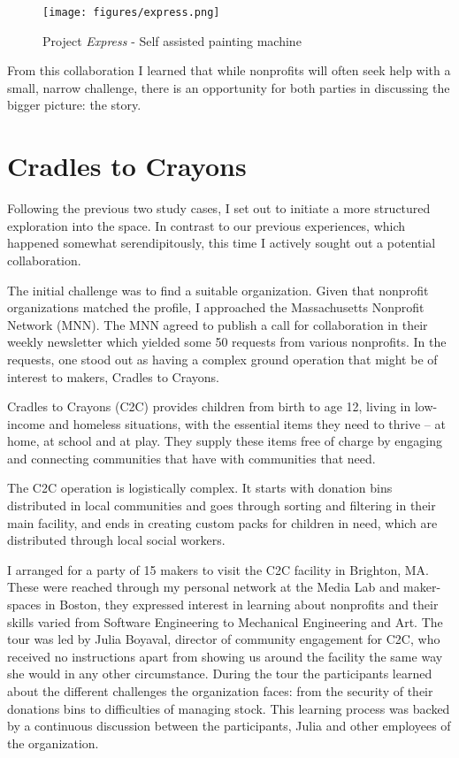    \begin{figure}[thpb]
      \centering
      \texttt{[image: figures/express.png]}
      \caption{Project \textit{Express} - Self assisted painting machine}
      \label{express}
   \end{figure}

From this collaboration I learned that while nonprofits will often seek help with a small, narrow challenge, there is an opportunity for both parties in discussing the bigger picture: the story. 

\section{Cradles to Crayons}

Following the previous two study cases, I set out to initiate a more structured exploration into the space. In contrast to our previous experiences, which happened somewhat serendipitously, this time I actively sought out a potential collaboration. 

The initial challenge was to find a suitable organization. Given that nonprofit organizations matched the profile, I approached the Massachusetts Nonprofit Network (MNN). The MNN agreed to publish a call for collaboration in their weekly newsletter which yielded some 50 requests from various nonprofits. In the requests, one stood out as having a complex ground operation that might be of interest to makers, Cradles to Crayons.   

Cradles to Crayons (C2C) provides children from birth to age 12, living in low-income and homeless situations, with the essential items they need to thrive – at home, at school and at play. They supply these items free of charge by engaging and connecting communities that have with communities that need.

The C2C operation is logistically complex. It starts with donation bins distributed in local communities and goes through sorting and filtering in their main facility, and ends in creating custom packs for children in need, which are distributed through local social workers. 

I arranged for a party of 15 makers to visit the C2C facility in Brighton, MA. These were reached through my personal network at the Media Lab and maker-spaces in Boston, they expressed interest in learning about nonprofits and their skills varied from Software Engineering to Mechanical Engineering and Art. The tour was led by Julia Boyaval, director of community engagement for C2C, who received no instructions apart from showing us around the facility the same way she would in any other circumstance. During the tour the participants learned about the different challenges the organization faces: from the security of their donations bins to difficulties of managing stock. This learning process was backed by a continuous discussion between the participants, Julia and other employees of the organization. 

